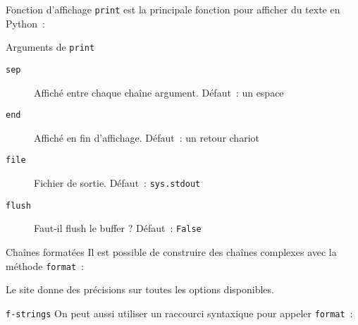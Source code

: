 \begin{frame}{Fonction d'affichage}
  \texttt{print} est la principale fonction pour afficher du texte en Python~:

\end{frame}

\begin{frame}{Arguments de \texttt{print}}
  \begin{description}
    \item[\texttt{sep}] Affiché entre chaque chaîne argument. Défaut~: un espace
    \item[\texttt{end}] Affiché en fin d'affichage. Défaut~: un retour chariot
    \item[\texttt{file}] Fichier de sortie. Défaut~: \texttt{sys.stdout}
    \item[\texttt{flush}] Faut-il flush le buffer ? Défaut~: \texttt{False}
  \end{description}

\end{frame}

\begin{frame}{Chaînes formatées}
  Il est possible de construire des chaînes complexes avec la méthode \texttt{format}~:


  Le site  donne des précisions sur toutes les options disponibles.  
\end{frame}

\begin{frame}{\texttt{f-strings}}
  On peut aussi utiliser un raccourci syntaxique pour appeler \texttt{format}~:

\end{frame}
